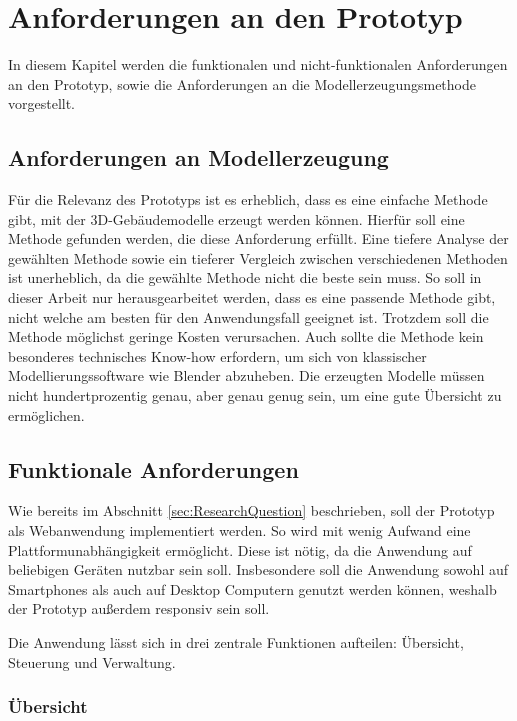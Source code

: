 \newpage
\section{Anforderungen an den Prototyp}\label{sec:Requirements}
In diesem Kapitel werden die funktionalen und nicht-funktionalen Anforderungen an den Prototyp, sowie die Anforderungen an die Modellerzeugungsmethode vorgestellt.

\subsection{Anforderungen an Modellerzeugung}

Für die Relevanz des Prototyps ist es erheblich, dass es eine einfache Methode gibt, mit der 3D-Gebäudemodelle erzeugt werden können. Hierfür soll eine Methode gefunden werden, die diese Anforderung erfüllt. Eine tiefere Analyse der gewählten Methode sowie ein tieferer Vergleich zwischen verschiedenen Methoden ist unerheblich, da die gewählte Methode nicht die beste sein muss. So soll in dieser Arbeit nur herausgearbeitet werden, dass es eine passende Methode gibt, nicht welche am besten für den Anwendungsfall geeignet ist. Trotzdem soll die Methode möglichst geringe Kosten verursachen. Auch sollte die Methode kein besonderes technisches Know-how erfordern, um sich von klassischer Modellierungssoftware wie Blender abzuheben. Die erzeugten Modelle müssen nicht hundertprozentig genau, aber genau genug sein, um eine gute Übersicht zu ermöglichen.

\subsection{Funktionale Anforderungen}\label{sec:FunctionalRequirements}
Wie bereits im Abschnitt \ref{sec:ResearchQuestion} beschrieben, soll der Prototyp als Webanwendung implementiert werden. So wird mit wenig Aufwand eine Plattformunabhängigkeit ermöglicht. Diese ist nötig, da die Anwendung auf beliebigen Geräten nutzbar sein soll. Insbesondere soll die Anwendung sowohl auf Smartphones als auch auf Desktop Computern genutzt werden können, weshalb der Prototyp außerdem responsiv sein soll.

Die Anwendung lässt sich in drei zentrale Funktionen aufteilen: Übersicht, Steuerung und Verwaltung.

\subsubsection{Übersicht}

